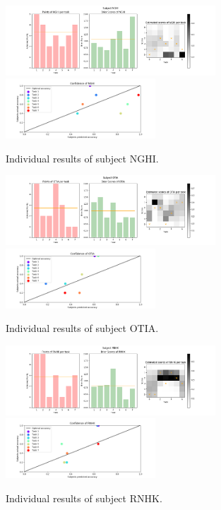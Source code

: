 \documentclass[../main/main.tex]{subfiles}
\begin{document}
	\begin{figure}[H]
		\centering
		\captionsetup{justification=centering}
		\includegraphics[width=0.7\textwidth]{../assets/NGHI_results.png}
		\includegraphics[width=0.5\textwidth]{../assets/NGHI_confidence.png}
		\caption{Individual results of subject NGHI.} 
		\label{fig:NGHI}
	\end{figure}
	\begin{figure}[H]
		\centering
		\captionsetup{justification=centering}
		\includegraphics[width=0.7\textwidth]{../assets/OTIA_results.png}
		\includegraphics[width=0.5\textwidth]{../assets/OTIA_confidence.png}
		\caption{Individual results of subject OTIA.} 
		\label{fig:OTIA}
	\end{figure}
	\begin{figure}[H]
		\centering
		\captionsetup{justification=centering}
		\includegraphics[width=0.7\textwidth]{../assets/RNHK_results.png}
		\includegraphics[width=0.5\textwidth]{../assets/RNHK_confidence.png}
		\caption{Individual results of subject RNHK.} 
		\label{fig:RNHK}
	\end{figure}
\end{document}
